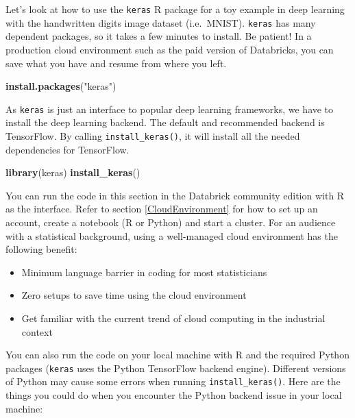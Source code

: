 \documentclass[12pt,]{krantz}
\makeatletter
\newenvironment{Shaded}{\begin{snugshade}}{\end{snugshade}}
\newcommand{\KeywordTok}[1]{\textcolor[rgb]{0.27,0.27,0.27}{\textbf{#1}}}
\newcommand{\NormalTok}[1]{#1}
\newcommand{\StringTok}[1]{\textcolor[rgb]{0.5,0.5,0.5}{#1}}
\providecommand{\tightlist}{%
  \setlength{\itemsep}{0pt}\setlength{\parskip}{0pt}}
\newenvironment{kframe}{%
\medskip{}
\setlength{\fboxsep}{.8em}
 \def\at@end@of@kframe{}%
 \ifinner\ifhmode%
  \def\at@end@of@kframe{\end{minipage}}%
  \begin{minipage}{\columnwidth}%
 \fi\fi%
 \def\FrameCommand##1{\hskip\@totalleftmargin \hskip-\fboxsep
 \colorbox{shadecolor}{##1}\hskip-\fboxsep
     \hskip-\linewidth \hskip-\@totalleftmargin \hskip\columnwidth}%
 \MakeFramed {\advance\hsize-\width
   \@totalleftmargin\z@ \linewidth\hsize
   \@setminipage}}%
 {\par\unskip\endMakeFramed%
 \at@end@of@kframe}
\renewenvironment{Shaded}{\begin{kframe}}{\end{kframe}}
\makeatother
\begin{document}
Let's look at how to use the \texttt{keras} R package for a toy example in deep learning with the handwritten digits image dataset (i.e.~MNIST). \texttt{keras} has many dependent packages, so it takes a few minutes to install. Be patient! In a production cloud environment such as the paid version of Databricks, you can save what you have and resume from where you left.

\begin{Shaded}
\begin{Highlighting}[]
\KeywordTok{install.packages}\NormalTok{(}\StringTok{"keras"}\NormalTok{)}
\end{Highlighting}
\end{Shaded}

As \texttt{keras} is just an interface to popular deep learning frameworks, we have to install the deep learning backend. The default and recommended backend is TensorFlow. By calling \texttt{install\_keras()}, it will install all the needed dependencies for TensorFlow.

\begin{Shaded}
\begin{Highlighting}[]
\KeywordTok{library}\NormalTok{(keras)}
\KeywordTok{install_keras}\NormalTok{()}
\end{Highlighting}
\end{Shaded}

You can run the code in this section in the Databrick community edition with R as the interface. Refer to section \ref{CloudEnvironment} for how to set up an account, create a notebook (R or Python) and start a cluster. For an audience with a statistical background, using a well-managed cloud environment has the following benefit:

\begin{itemize}
\tightlist
\item
  Minimum language barrier in coding for most statisticians
\item
  Zero setups to save time using the cloud environment
\item
  Get familiar with the current trend of cloud computing in the industrial context
\end{itemize}

You can also run the code on your local machine with R and the required Python packages (\texttt{keras} uses the Python TensorFlow backend engine). Different versions of Python may cause some errors when running \texttt{install\_keras()}. Here are the things you could do when you encounter the Python backend issue in your local machine:
\end{document}
